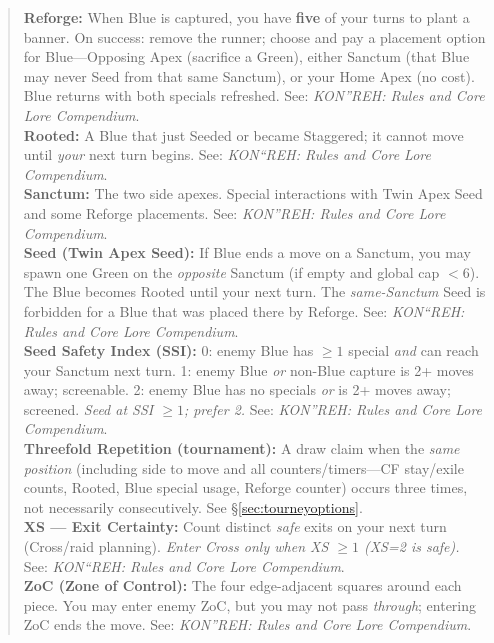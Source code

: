 \documentclass[11pt]{article}
\begin{document}
\begin{quote}
\textbf{Reforge:} When Blue is captured, you have \textbf{five} of your turns to plant a banner. On success: remove the runner; choose and pay a placement option for Blue---Opposing Apex (sacrifice a Green), either Sanctum (that Blue may never Seed from that same Sanctum), or your Home Apex (no cost). Blue returns with both specials refreshed. See: \textit{KON''REH: Rules and Core Lore Compendium}.\\

\textbf{Rooted:} A Blue that just Seeded or became Staggered; it cannot move until \emph{your} next turn begins. See: \textit{KON``REH: Rules and Core Lore Compendium}.\\

\textbf{Sanctum:} The two side apexes. Special interactions with Twin Apex Seed and some Reforge placements. See: \textit{KON''REH: Rules and Core Lore Compendium}.\\

\textbf{Seed (Twin Apex Seed):} If Blue ends a move on a Sanctum, you may spawn one Green on the \emph{opposite} Sanctum (if empty and global cap $<6$). The Blue becomes Rooted until your next turn. The \emph{same-Sanctum} Seed is forbidden for a Blue that was placed there by Reforge. See: \textit{KON``REH: Rules and Core Lore Compendium}.\\

\textbf{Seed Safety Index (SSI):} 0: enemy Blue has $\ge1$ special \emph{and} can reach your Sanctum next turn. 1: enemy Blue \emph{or} non-Blue capture is 2+ moves away; screenable. 2: enemy Blue has no specials \emph{or} is 2+ moves away; screened. \emph{Seed at SSI $\ge1$; prefer 2.} See: \textit{KON''REH: Rules and Core Lore Compendium}.\\

\textbf{Threefold Repetition (tournament):} A draw claim when the \emph{same position} (including side to move and all counters/timers---CF stay/exile counts, Rooted, Blue special usage, Reforge counter) occurs three times, not necessarily consecutively. See \S\ref{sec:tourneyoptions}.\\

\textbf{XS --- Exit Certainty:} Count distinct \emph{safe} exits on your next turn (Cross/raid planning). \emph{Enter Cross only when XS $\ge1$ (XS=2 is safe).} See: \textit{KON``REH: Rules and Core Lore Compendium}.\\

\textbf{ZoC (Zone of Control):} The four edge-adjacent squares around each piece. You may enter enemy ZoC, but you may not pass \emph{through}; entering ZoC ends the move. See: \textit{KON''REH: Rules and Core Lore Compendium}.\\


\end{quote}
\end{document}
